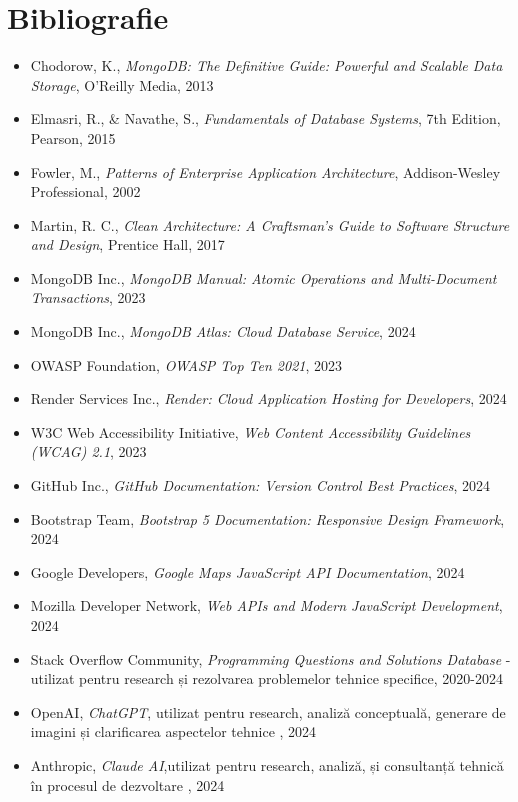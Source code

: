 \documentclass[12pt,a4paper]{report}
\begin{document}
\chapter{Bibliografie}
\begin{itemize}
    \item Chodorow, K., \textit{MongoDB: The Definitive Guide: Powerful and Scalable Data Storage}, O'Reilly Media, 2013
    \item Elmasri, R., \& Navathe, S., \textit{Fundamentals of Database Systems}, 7th Edition, Pearson, 2015
    \item Fowler, M., \textit{Patterns of Enterprise Application Architecture}, Addison-Wesley Professional, 2002
    \item Martin, R. C., \textit{Clean Architecture: A Craftsman's Guide to Software Structure and Design}, Prentice Hall, 2017
    \item MongoDB Inc., \textit{MongoDB Manual: Atomic Operations and Multi-Document Transactions}, 2023
    \item MongoDB Inc., \textit{MongoDB Atlas: Cloud Database Service}, 2024
    \item OWASP Foundation, \textit{OWASP Top Ten 2021}, 2023
    \item Render Services Inc., \textit{Render: Cloud Application Hosting for Developers}, 2024
    \item W3C Web Accessibility Initiative, \textit{Web Content Accessibility Guidelines (WCAG) 2.1}, 2023
    \item GitHub Inc., \textit{GitHub Documentation: Version Control Best Practices}, 2024
    \item Bootstrap Team, \textit{Bootstrap 5 Documentation: Responsive Design Framework}, 2024
    \item Google Developers, \textit{Google Maps JavaScript API Documentation}, 2024
    \item Mozilla Developer Network, \textit{Web APIs and Modern JavaScript Development}, 2024
    \item Stack Overflow Community, \textit{Programming Questions and Solutions Database} - utilizat pentru research și rezolvarea problemelor tehnice specifice, 2020-2024
    \item OpenAI, \textit{ChatGPT}, utilizat pentru research, analiză conceptuală, generare de imagini și clarificarea aspectelor tehnice , 2024
    \item Anthropic, \textit{Claude AI},utilizat pentru research, analiză, și consultanță tehnică în procesul de dezvoltare , 2024

\end{itemize}
\end{document}
